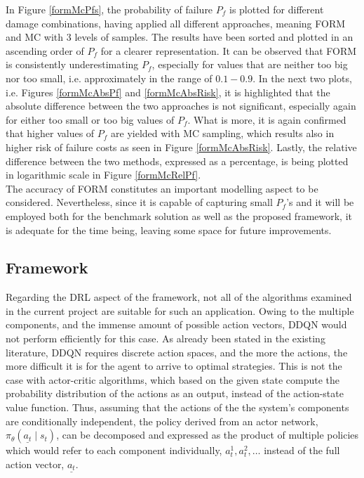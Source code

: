 In Figure \ref{formMcPfs}, the probability of failure $P_f$ is plotted for different damage combinations, having applied all different approaches, meaning \gls{FORM} and \gls{MC} with 3 levels of samples. The results have been sorted and plotted in an ascending order of $P_f$ for a clearer representation. It can be observed that \gls{FORM} is consistently underestimating $P_f$, especially for values that are neither too big nor too small, i.e. approximately in the range of $0.1 - 0.9$. In the next two plots, i.e. Figures \ref{formMcAbsPf} and \ref{formMcAbsRisk}, it is highlighted that the absolute difference between the two approaches is not significant, especially again for either too small or too big values of $P_f$. What is more, it is again confirmed that higher values of $P_f$ are yielded with \gls{MC} sampling, which results also in higher risk of failure costs as seen in Figure \ref{formMcAbsRisk}. Lastly, the relative difference between the two methods, expressed as a percentage, is being plotted in logarithmic scale in Figure \ref{formMcRelPf}.\\

The accuracy of \gls{FORM} constitutes an important modelling aspect to be considered. Nevertheless, since it is capable of capturing small $P_f$'s and it will be employed both for the benchmark solution as well as the proposed framework, it is adequate for the time being, leaving some space for future improvements.





\subsection{Framework} \label{caseFrameSec}


Regarding the \gls{DRL} aspect of the framework, not all of the algorithms examined in the current project are suitable for such an application. Owing to the multiple components, and the immense amount of possible action vectors, \gls{DDQN} would not perform efficiently for this case. As already been stated in the existing literature, \gls{DDQN} requires discrete action spaces, and the more the actions, the more difficult it is for the agent to arrive to optimal strategies. This is not the case with actor-critic algorithms, which based on the given state compute the probability distribution of the actions as an output, instead of the action-state value function. Thus, assuming that the actions of the the system's components are conditionally independent, the policy derived from an actor network, $\pi _{\theta}(\underline{a_t}\mid s_t)$, can be decomposed and expressed as the product of multiple policies which would refer to each component individually, $a_t^1, a_t^2, \ldots$ instead of the full action vector, $\underline{a_t}$. 

